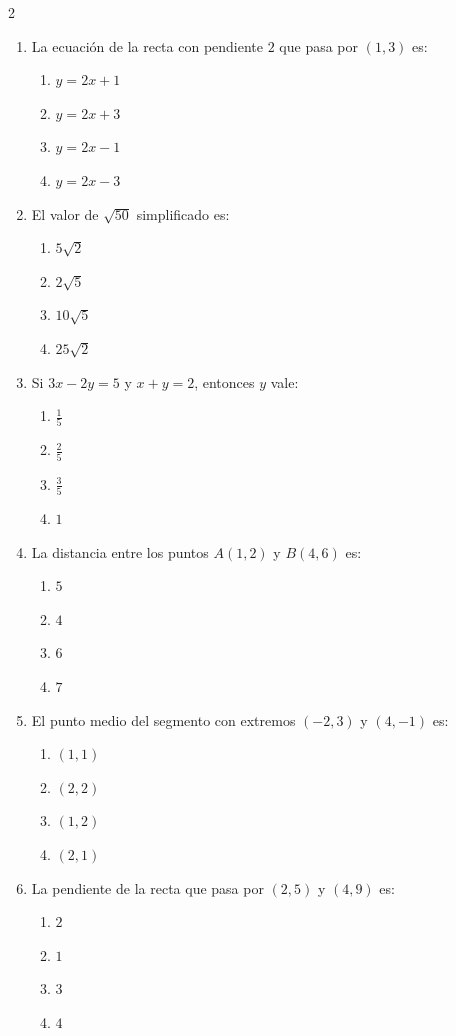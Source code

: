 \documentclass[10pt]{article}
\begin{document}
\begin{multicols}{2}
\begin{enumerate}
\item La ecuación de la recta con pendiente $2$ que pasa por $(1,3)$ es:
\begin{enumerate}[label=(\alph*)]
\item $y = 2x + 1$
\item $y = 2x + 3$
\item $y = 2x - 1$
\item $y = 2x - 3$
\end{enumerate}

\item El valor de $\sqrt{50}$ simplificado es:
\begin{enumerate}[label=(\alph*)]
\item $5\sqrt{2}$
\item $2\sqrt{5}$
\item $10\sqrt{5}$
\item $25\sqrt{2}$
\end{enumerate}

\item Si $3x - 2y = 5$ y $x + y = 2$, entonces $y$ vale:
\begin{enumerate}[label=(\alph*)]
\item $\frac{1}{5}$
\item $\frac{2}{5}$
\item $\frac{3}{5}$
\item $1$
\end{enumerate}


\item La distancia entre los puntos $A(1,2)$ y $B(4,6)$ es:
\begin{enumerate}[label=(\alph*)]
\item $5$
\item $4$
\item $6$
\item $7$
\end{enumerate}

\item El punto medio del segmento con extremos $(-2,3)$ y $(4,-1)$ es:
\begin{enumerate}[label=(\alph*)]
\item $(1,1)$
\item $(2,2)$
\item $(1,2)$
\item $(2,1)$
\end{enumerate}

\item La pendiente de la recta que pasa por $(2,5)$ y $(4,9)$ es:
\begin{enumerate}[label=(\alph*)]
\item $2$
\item $1$
\item $3$
\item $4$
\end{enumerate}


\end{enumerate}
\end{multicols}
\end{document}
